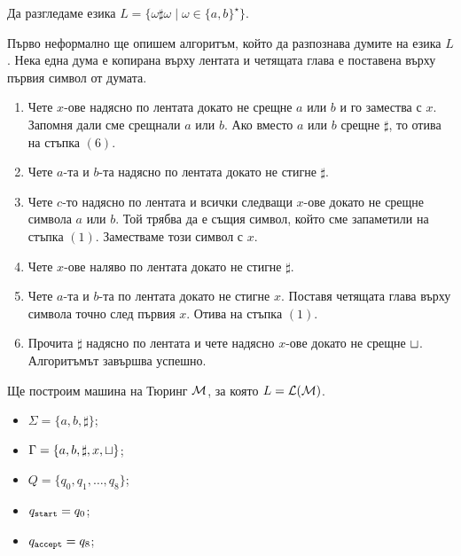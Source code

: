 \begin{example}
  Да разгледаме езика $L = \{\omega \sharp \omega \mid \omega\in\{a,b\}^\star\}$.
  
  Първо неформално ще опишем алгоритъм, който да разпознава думите на езика $L$.
  Нека една дума е копирана върху лентата и четящата глава е поставена върху първия символ от думата.
  \begin{enumerate}[(1)]
  \item 
    Чете $x$-ове надясно по лентата докато не срещне $a$ или $b$ и го замества с $x$.
    Запомня дали сме срещнали $a$ или $b$.
    Ако вместо $a$ или $b$ срещне $\sharp$, то отива на стъпка $(6)$.
  \item
    Чете $a$-та и $b$-та надясно по лентата докато не стигне $\sharp$. 
  \item
    Чете $c$-то надясно по лентата и всички следващи $x$-ове докато не срещне символа $a$ или $b$.
    Той трябва да е същия символ, който сме запаметили на стъпка $(1)$.
    Заместваме този символ с $x$.
  \item
    Чете $x$-ове наляво по лентата докато не стигне $\sharp$.
  \item
    Чете $a$-та и $b$-та по лентата докато не стигне $x$.
    Поставя четящата глава върху символа точно след първия $x$.
    Отива на стъпка $(1)$.
  \item
    Прочита $\sharp$ надясно по лентата и чете надясно $x$-ове докато не срещне $\sqcup$.
    Алгоритъмът завършва успешно.
  \end{enumerate}

  Ще построим машина на Тюринг $\mathcal{M}$, за която $L = \mathcal{L}(\mathcal{M})$.
  \begin{itemize}
  \item 
    $\Sigma = \{a,b,\sharp\}$;
  \item
    $\Gamma = \{a,b,\sharp,x,\sqcup\}$;
  \item
    $Q = \{q_0,q_1,\dots,q_8\}$;
  \item
    $q_{\texttt{start}} = q_0$;
  \item
    $q_{\texttt{accept}} = q_8$;
  \end{itemize}

  \begin{framed}
  \begin{figure}[H]
    \begin{center}
\end{center}
\end{figure}
\end{framed}
\end{example}
